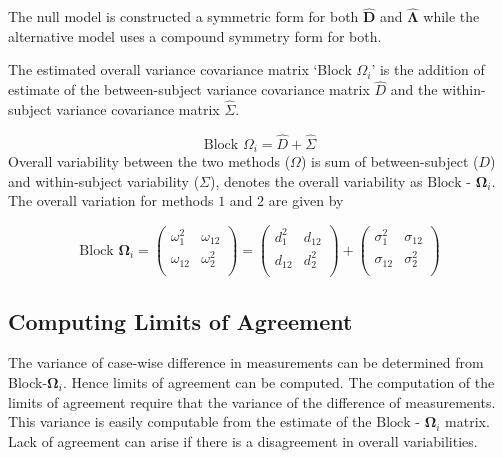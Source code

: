 \documentclass[12pt, a4paper]{report}
\theoremstyle{plain}
\theoremstyle{definition}
\theoremstyle{remark}
\begin{document}
	The null model is constructed a symmetric form for both $\boldsymbol{\hat{D}}$ and $\boldsymbol{\hat{\Lambda}}$ while the alternative model uses a compound symmetry form for both.
	
	
	The estimated overall variance covariance matrix `Block
	$\Omega_{i}$' is the addition of estimate of the between-subject variance covariance matrix $\hat{D}$ and the within-subject variance covariance matrix $\hat{\Sigma}$.
	
	\begin{equation}
	\mbox{Block  }\Omega_{i} = \hat{D} + \hat{\Sigma}
	\end{equation}
	Overall variability between the two methods ($\Omega$) is sum of between-subject ($D$) and within-subject variability ($\Sigma$),
	\citet{ARoy2009} denotes the overall variability	as ${\mbox{Block - }\boldsymbol \Omega_{i}}$. The overall variation for methods $1$ and $2$ are given by
	
	\begin{center}
		\[\mbox{Block } \boldsymbol{\Omega}_i = \left(\begin{array}{cc}
		\omega^2_1  & \omega_{12} \\
		\omega_{12} & \omega^2_2 \\
		\end{array}  \right)
		=  \left(
		\begin{array}{cc}
		d^2_1  & d_{12} \\
		d_{12} & d^2_2 \\
		\end{array} \right)+
		\left(
		\begin{array}{cc}
		\sigma^2_1  & \sigma_{12} \\
		\sigma_{12} & \sigma^2_2 \\
		\end{array}\right)
		\]
	\end{center}
	
	\subsection{Computing Limits of Agreement}
	The variance of case-wise difference in measurements can be determined from Block-$\boldsymbol{\Omega}_{i}$. Hence limits of agreement can be computed. The computation of the limits of agreement require that the variance of the difference of measurements. This variance is easily computable from the estimate of the ${\mbox{Block - }\boldsymbol \Omega_{i}}$ matrix. Lack of agreement can arise if there is a disagreement in overall variabilities. 
	
\end{document}
